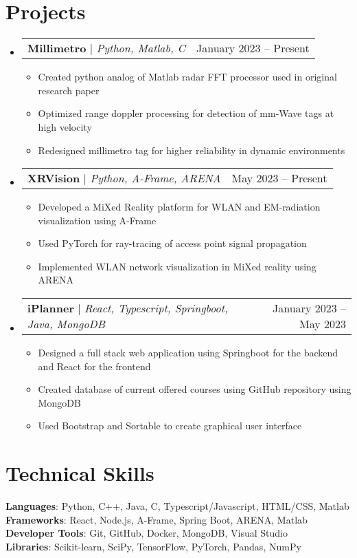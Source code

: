 \documentclass[letterpaper,11pt]{article}
\makeatletter
\newcommand{\resumeItem}[1]{
  \item\small{
    {#1 \vspace{-2pt}}
  }
}
\newcommand{\resumeProjectHeading}[2]{
    \item
    \begin{tabular*}{0.97\textwidth}{l@{\extracolsep{\fill}}r}
      \small#1 & #2 \\
    \end{tabular*}\vspace{-7pt}
}
\newcommand{\resumeSubHeadingListStart}{\begin{itemize}[leftmargin=0.15in, label={}]}
\newcommand{\resumeSubHeadingListEnd}{\end{itemize}}
\newcommand{\resumeItemListStart}{\begin{itemize}}
\newcommand{\resumeItemListEnd}{\end{itemize}\vspace{-5pt}}
\makeatother
\begin{document}
\section{Projects}
    \resumeSubHeadingListStart
      \resumeProjectHeading
          {\textbf{Millimetro} $|$ \emph{Python, Matlab, C}}{January 2023 -- Present}
          \resumeItemListStart
            \resumeItem{Created python analog of Matlab radar FFT processor used in original research paper}
            \resumeItem{Optimized range doppler processing for detection of mm-Wave tags at high velocity}
            \resumeItem{Redesigned millimetro tag for higher reliability in dynamic environments}
          \resumeItemListEnd
     \resumeProjectHeading
          {\textbf{XRVision} $|$ \emph{Python, A-Frame, ARENA}}{May 2023 -- Present}
          \resumeItemListStart
            \resumeItem{Developed a MiXed Reality platform for WLAN and EM-radiation visualization using A-Frame}
            \resumeItem{Used PyTorch for ray-tracing of access point signal propagation}
            \resumeItem{Implemented WLAN network visualization in MiXed reality using ARENA}
          \resumeItemListEnd
     \resumeProjectHeading
          {\textbf{iPlanner} $|$ \emph{React, Typescript, Springboot, Java, MongoDB}}{January 2023 -- May 2023}
          \resumeItemListStart
            \resumeItem{Designed a full stack web application using Springboot for the backend and React for the frontend}
            \resumeItem{Created database of current offered courses using GitHub repository using MongoDB}
            \resumeItem{Used Bootstrap and Sortable to create graphical user interface}
          \resumeItemListEnd
    \resumeSubHeadingListEnd

\section{Technical Skills}
 \begin{itemize}[leftmargin=0.15in, label={}]
    \small{\item{
     \textbf{Languages}{: Python, C++, Java, C, Typescript/Javascript, HTML/CSS, Matlab} \\
     \textbf{Frameworks}{: React, Node.js, A-Frame, Spring Boot, ARENA, Matlab} \\
     \textbf{Developer Tools}{: Git, GitHub, Docker, MongoDB, Visual Studio} \\
     \textbf{Libraries}{: Scikit-learn, SciPy, TensorFlow, PyTorch, Pandas, NumPy} \\
     }}
 \end{itemize}
\end{document}
